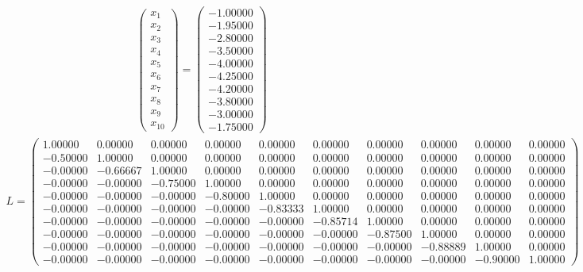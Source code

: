 \documentclass[]{jsarticle}
\begin{document}
\begin{eqnarray}
\left(
\begin{array}{r}
 x_1\\
x_2\\
x_3\\
x_4\\
x_5\\
x_6\\
x_7\\
x_8\\
x_9\\
x_{10}
\end{array}
\right) =
\left(
\begin{array}{r}
-1.00000\\
-1.95000\\
-2.80000\\
-3.50000\\
-4.00000\\
-4.25000\\
-4.20000\\
-3.80000\\
-3.00000\\
-1.75000
\end{array}
\right)\nonumber
\end{eqnarray}
\begin{eqnarray}
L = 
\left(
\begin{array}{rrrrrrrrrr}
1.00000 &0.00000 &0.00000 &0.00000 &0.00000 &0.00000 &0.00000 &0.00000 &0.00000 &0.00000\\
-0.50000 &1.00000 &0.00000 &0.00000 &0.00000 &0.00000 &0.00000 &0.00000 &0.00000 &0.00000\\
-0.00000 &-0.66667 &1.00000 &0.00000 &0.00000 &0.00000 &0.00000 &0.00000 &0.00000 &0.00000\\
-0.00000 &-0.00000 &-0.75000 &1.00000 &0.00000 &0.00000 &0.00000 &0.00000 &0.00000 &0.00000\\
-0.00000 &-0.00000 &-0.00000 &-0.80000 &1.00000 &0.00000 &0.00000 &0.00000 &0.00000 &0.00000\\
-0.00000 &-0.00000 &-0.00000 &-0.00000 &-0.83333 &1.00000 &0.00000 &0.00000 &0.00000 &0.00000\\
-0.00000 &-0.00000 &-0.00000 &-0.00000 &-0.00000 &-0.85714 &1.00000 &0.00000 &0.00000 &0.00000\\
-0.00000 &-0.00000 &-0.00000 &-0.00000 &-0.00000 &-0.00000 &-0.87500 &1.00000 &0.00000 &0.00000\\
-0.00000 &-0.00000 &-0.00000 &-0.00000 &-0.00000 &-0.00000 &-0.00000 &-0.88889 &1.00000 &0.00000\\
-0.00000 &-0.00000 &-0.00000 &-0.00000 &-0.00000 &-0.00000 &-0.00000 &-0.00000 &-0.90000 &1.00000
\end{array}
\right)\nonumber
\end{eqnarray}
\end{document}
